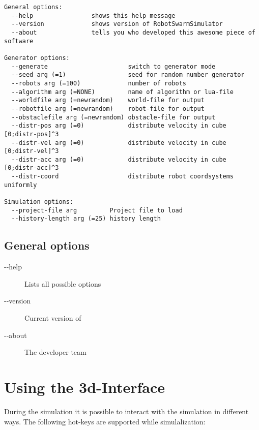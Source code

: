 \documentclass[a4paper,halfparskip,11pt,twoside]{scrartcl}
\begin{document}
\begin{lstlisting}[caption={RSS Helpline},label=lst:RSS-help]
General options:
  --help                shows this help message
  --version             shows version of RobotSwarmSimulator
  --about               tells you who developed this awesome piece of software

Generator options:
  --generate                      switch to generator mode
  --seed arg (=1)                 seed for random number generator
  --robots arg (=100)             number of robots
  --algorithm arg (=NONE)         name of algorithm or lua-file
  --worldfile arg (=newrandom)    world-file for output
  --robotfile arg (=newrandom)    robot-file for output
  --obstaclefile arg (=newrandom) obstacle-file for output
  --distr-pos arg (=0)            distribute velocity in cube [0;distr-pos]^3
  --distr-vel arg (=0)            distribute velocity in cube [0;distr-vel]^3
  --distr-acc arg (=0)            distribute velocity in cube [0;distr-acc]^3
  --distr-coord                   distribute robot coordsystems uniformly

Simulation options:
  --project-file arg         Project file to load
  --history-length arg (=25) history length
\end{lstlisting}


\subsection{General options}
\begin{description}
	\item [-{}-help] Lists all possible options
	\item [-{}-version] Current version of \RSS
	\item [-{}-about] The developer team
\end{description}




\section{Using the 3d-Interface}
During the simulation it is possible to interact with the simulation in different ways. The following hot-keys are supported while simulalization:
\end{document}
